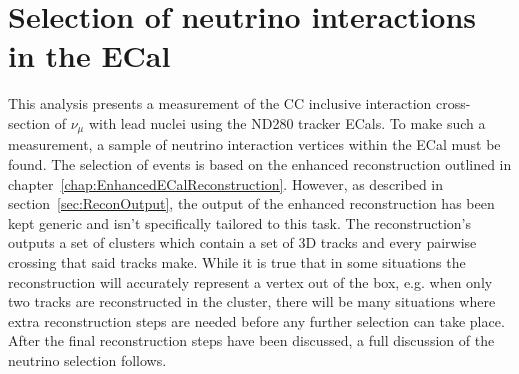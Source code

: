 


\chapter{Selection of neutrino interactions in the ECal}
\label{chap:NeutrinoInteractionSelection}
This analysis presents a measurement of the CC inclusive interaction cross-section of $\nu_\mu$ with lead nuclei using the ND280 tracker ECals.  To make such a measurement, a sample of neutrino interaction vertices within the ECal must be found.  The selection of events is based on the enhanced reconstruction outlined in chapter~\ref{chap:EnhancedECalReconstruction}.  However, as described in section~\ref{sec:ReconOutput}, the output of the enhanced reconstruction has been kept generic and isn't specifically tailored to this task.  The reconstruction's outputs a set of clusters which contain a set of 3D tracks and every pairwise crossing that said tracks make.  While it is true that in some situations the reconstruction will accurately represent a vertex out of the box, e.g. when only two tracks are reconstructed in the cluster, there will be many situations where extra reconstruction steps are needed before any further selection can take place.  After the final reconstruction steps have been discussed, a full discussion of the neutrino selection follows.

